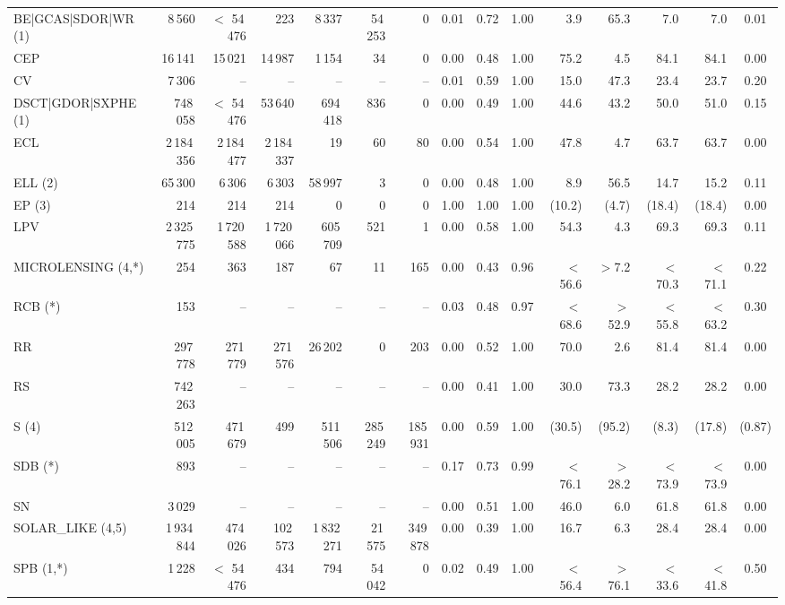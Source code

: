 \documentclass[longauth]{aa}
\begin{document}
\begin{landscape}
\begin{table}
\begin{tabular}{@{}lrrrrrrcccrrrrc@{}}
BE|GCAS|SDOR|WR (1) & 8\,560 & $<$ 54\,476 & 223 & 8\,337 & 54\,253 & 0 & 0.01 & 0.72 & 1.00 & 3.9 & 65.3 & 7.0 & 7.0 & 0.01 \\
CEP & 16\,141 & 15\,021 & 14\,987 & 1\,154 & 34 & 0 & 0.00 & 0.48 & 1.00 & 75.2 & 4.5 & 84.1 & 84.1 & 0.00 \\
CV & 7\,306 & -- & -- & -- & -- & -- & 0.01 & 0.59 & 1.00 & 15.0 & 47.3 & 23.4 & 23.7 & 0.20 \\
DSCT|GDOR|SXPHE (1) & 748\,058 & $<$ 54\,476 & 53\,640 & 694\,418 & 836 & 0 & 0.00 & 0.49 & 1.00 & 44.6 & 43.2 & 50.0 & 51.0 & 0.15 \\
ECL & 2\,184\,356 & 2\,184\,477 & 2\,184\,337 & 19 & 60 & 80 & 0.00 & 0.54 & 1.00 & 47.8 & 4.7 & 63.7 & 63.7 & 0.00 \\
ELL (2) & 65\,300 & 6\,306 & 6\,303 & 58\,997 & 3 & 0 & 0.00 & 0.48 & 1.00 & 8.9 & 56.5 & 14.7 & 15.2 & 0.11 \\
EP (3) & 214 & 214 & 214 & 0 & 0 & 0 & 1.00 & 1.00 & 1.00 & (10.2) & (4.7) & (18.4) & (18.4) & 0.00 \\
LPV & 2\,325\,775 & 1\,720\,588 & 1\,720\,066 & 605\,709 & 521 & 1 & 0.00 & 0.58 & 1.00 & 54.3 & 4.3 & 69.3 & 69.3 & 0.11 \\
MICROLENSING (4,*) & 254 & 363 & 187 & 67 & 11 & 165 & 0.00 & 0.43 & 0.96 & $<$56.6 & $>$7.2 & $<$70.3 & $<$71.1 & 0.22 \\
RCB (*) & 153 & -- & -- & -- & -- & -- & 0.03 & 0.48 & 0.97 & $<$68.6 & $>$52.9 & $<$55.8 & $<$63.2 & 0.30 \\
RR & 297\,778 & 271\,779 & 271\,576 & 26\,202 & 0 & 203 & 0.00 & 0.52 & 1.00 & 70.0 & 2.6 & 81.4 & 81.4 & 0.00 \\
RS & 742\,263 & -- & -- & -- & -- & -- & 0.00 & 0.41 & 1.00 & 30.0 & 73.3 & 28.2 & 28.2 & 0.00  \\
S (4) & 512\,005 & 471\,679 & 499 & 511\,506 & 285\,249 & 185\,931 & 0.00 & 0.59 & 1.00 & (30.5) & (95.2) & (8.3) & (17.8) & (0.87) \\
SDB (*) & 893 & -- & -- & -- & -- & -- & 0.17 & 0.73 & 0.99 & $<$76.1 & $>$28.2 & $<$73.9 & $<$73.9 & 0.00 \\
SN & 3\,029 & -- & -- & -- & -- & -- & 0.00 & 0.51 & 1.00 & 46.0 & 6.0 & 61.8 & 61.8 & 0.00 \\
SOLAR\_LIKE (4,5) & 1\,934\,844 & 474\,026 & 102\,573 & 1\,832\,271 & 21\,575 & 349\,878 & 0.00 & 0.39 & 1.00 & 16.7 & 6.3 & 28.4 & 28.4 & 0.00 \\
SPB (1,*) & 1\,228 & $<$ 54\,476 & 434 & 794 & 54\,042 & 0 & 0.02 & 0.49 & 1.00 & $<$56.4 & $>$76.1 & $<$33.6 & $<$41.8 & 0.50 \\

\end{tabular}
\end{table}
\end{landscape}
\end{document}
